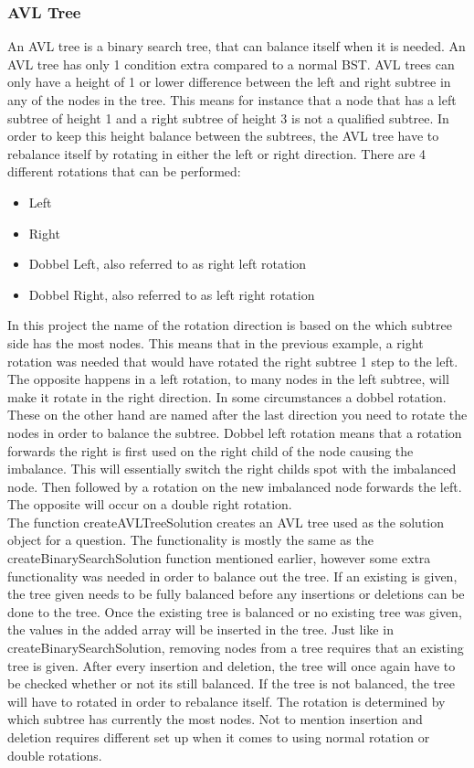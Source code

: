 \subsubsection{AVL Tree}
An AVL tree is a binary search tree, that can balance itself when it is needed. An AVL tree has only 1 condition extra compared to a normal BST. AVL trees can only have a height of 1 or lower difference between the left and right subtree in any of the nodes in the tree. This means for instance that a node that has a left subtree of height 1 and a right subtree of height 3 is not a qualified subtree. In order to keep this height balance between the subtrees, the AVL tree have to rebalance itself by rotating in either the left or right direction. There are 4 different rotations that can be performed:
\begin{itemize}
	\item{Left}
	\item{Right}
	\item{Dobbel Left, also referred to as right left rotation}
	\item{Dobbel Right, also referred to as left right rotation}
\end{itemize}
In this project the name of the rotation direction is based on the which subtree side has the most nodes. This means that in the previous example, a right rotation was needed that would have rotated the right subtree 1 step to the left. The opposite happens in a left rotation, to many nodes in the left subtree, will make it rotate in the right direction. In some circumstances a dobbel rotation. These on the other hand are named after the last direction you need to rotate the nodes in order to balance the subtree. Dobbel left rotation means that a rotation forwards the right is first used on the right child of the node causing the imbalance. This will essentially switch the right childs spot with the imbalanced node. Then followed by a rotation on the new imbalanced node forwards the left. The opposite will occur on a double right rotation.
\\[11pt]
The function createAVLTreeSolution creates an AVL tree used as the solution object for a question. The functionality is mostly the same as the createBinarySearchSolution function mentioned earlier, however some extra functionality was needed in order to balance out the tree. If an existing is given, the tree given needs to be fully balanced before any insertions or deletions can be done to the tree. Once the existing tree is balanced or no existing tree was given, the values in the added array will be inserted in the tree. Just like in createBinarySearchSolution, removing nodes from a tree requires that an existing tree is given. After every insertion and deletion, the tree will once again have to be checked whether or not its still balanced. If the tree is not balanced, the tree will have to rotated in order to rebalance itself. The rotation is determined by which subtree has currently the most nodes. Not to mention insertion and deletion requires different set up when it comes to using normal rotation or double rotations.
